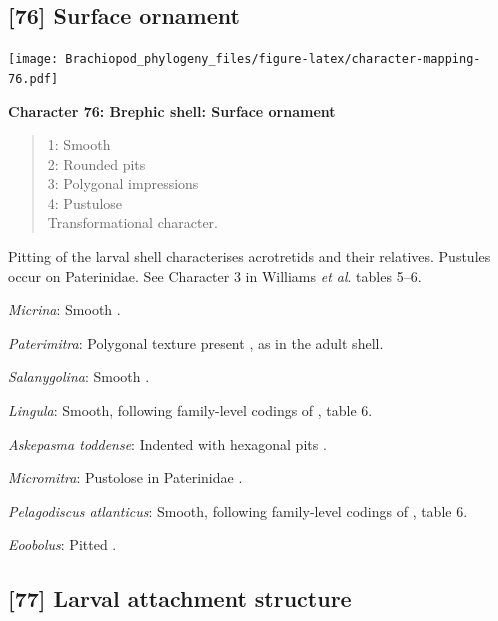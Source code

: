 \documentclass[]{book}
\theoremstyle{definition}
\theoremstyle{definition}
\theoremstyle{definition}
\theoremstyle{remark}
\begin{document}
\hypertarget{surface-ornament}{%
\subsection*{{[}76{]} Surface ornament}\label{surface-ornament}}

\texttt{[image: Brachiopod\_phylogeny\_files/figure-latex/character-mapping-76.pdf]}

\textbf{Character 76: Brephic shell: Surface ornament}

\begin{quote}
1: Smooth\\
2: Rounded pits\\
3: Polygonal impressions\\
4: Pustulose\\
Transformational character.
\end{quote}

Pitting of the larval shell characterises acrotretids and their
relatives. Pustules occur on Paterinidae. See Character 3 in Williams
\emph{et al}. \citeyearpar{Williams2000BrachiopodaLinguliformea} tables
5--6.

\emph{Micrina}: Smooth \citep{Holmer2011Firstrecord}.

\emph{Paterimitra}: Polygonal texture present
\citep{Holmer2011Firstrecord}, as in the adult shell.

\emph{Salanygolina}: Smooth \citep{Holmer2009Theenigmatic}.

\emph{Lingula}: Smooth, following family-level codings of
\citet{Williams2000BrachiopodaLinguliformea}, table 6.

\emph{Askepasma toddense}: Indented with hexagonal pits \citep[appendix
2]{Williams1998Thediversity}.

\emph{Micromitra}: Pustolose in Paterinidae \citep[table
6]{Williams2000BrachiopodaLinguliformea}.

\emph{Pelagodiscus atlanticus}: Smooth, following family-level codings
of \citet{Williams2000BrachiopodaLinguliformea}, table 6.

\emph{Eoobolus}: Pitted \citep[table
8]{Williams2000BrachiopodaLinguliformea}.

\hypertarget{larval-attachment-structure}{%
\subsection*{{[}77{]} Larval attachment
structure}\label{larval-attachment-structure}}
\end{document}
